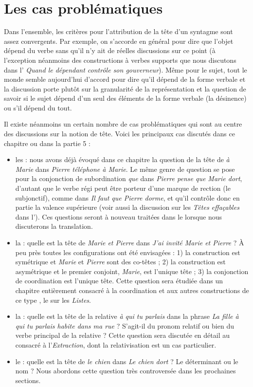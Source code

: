 \section{Les cas problématiques}\label{sec:3.3.21}

Dans l’ensemble, les critères pour l’attribution de la tête d’un syntagme sont assez convergents. Par exemple, on s’accorde en général pour dire que l’objet dépend du verbe sans qu’il n’y ait de réelles discussions sur ce point (à l’exception néanmoins des constructions à verbes supports que nous discutons dans l’ \textit{Quand le dépendant contrôle son gouverneur}). Même pour le sujet, tout le monde semble aujourd’hui d’accord pour dire qu’il dépend de la forme verbale et la discussion porte plutôt sur la granularité de la représentation et la question de savoir si le sujet dépend d’un seul des éléments de la forme verbale (la désinence) ou s’il dépend du tout.

Il existe néanmoins un certain nombre de cas problématiques qui sont au centre des discussions sur la notion de tête. Voici les principaux cas discutés dans ce chapitre ou dans la partie 5 :

\begin{itemize}
\item les : nous avons déjà évoqué dans ce chapitre la question de la tête de \textit{à Marie} dans \textit{Pierre téléphone à Marie}. Le même genre de question se pose pour la conjonction de subordination \textit{que} dans \textit{Pierre pense que Marie dort}, d’autant que le verbe régi peut être porteur d’une marque de rection (le subjonctif), comme dans \textit{Il faut que Pierre dorme}, et qu’il contrôle donc en partie la valence supérieure (voir aussi la discussion sur les \textit{Têtes effaçables} dans l’). Ces questions seront à nouveau traitées dans le  lorsque nous discuterons la translation.
\item la : quelle est la tête de \textit{Marie et Pierre} dans \textit{J’ai invité Marie et Pierre} ? À peu près toutes les configurations ont été envisagées : 1) la construction est symétrique et \textit{Marie} et \textit{Pierre} sont des co-têtes ; 2) la construction est asymétrique et le premier conjoint, \textit{Marie}, est l’unique tête ; 3) la conjonction de coordination est l’unique tête. Cette question sera étudiée dans un chapitre entièrement consacré à la coordination et aux autres constructions de ce type , le  sur les \textit{Listes}.
\item la : quelle est la tête de la relative \textit{à qui tu parlais} dans la phrase \textit{La fille à qui tu parlais habite dans ma rue} ? S’agit-il du pronom relatif ou bien du verbe principal de la relative ? Cette question sera discutée en détail au  consacré à l’\textit{Extraction}, dont la relativisation est un cas particulier.
\item le : quelle est la tête de \textit{le chien} dans \textit{Le chien dort} ? Le déterminant ou le nom ? Nous abordons cette question très controversée dans les prochaines sections.
\end{itemize}

